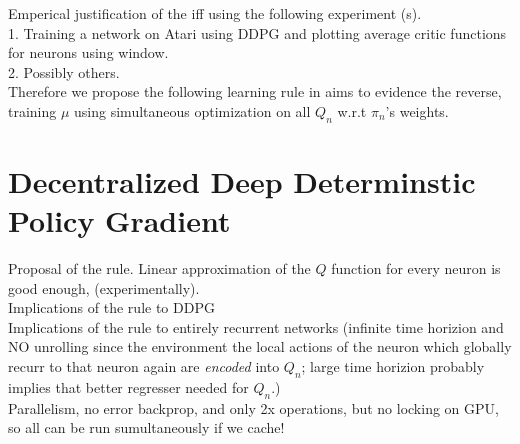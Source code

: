 \documentclass{article} %
\numberwithin{equation}{subsection}
\numberwithin{theorem}{subsection}
\begin{document}
Emperical justification of the iff using the following experiment (s).\\
1. Training a network on Atari using DDPG and plotting average critic functions for neurons using window. \\[2cm]
2. Possibly others. \\[2cm]


Therefore we propose the following learning rule in aims to evidence the reverse, training $\mu$ using simultaneous optimization on all $Q_n$ w.r.t $\pi_n$'s weights.


\section{Decentralized Deep Determinstic Policy Gradient}
Proposal of the rule. Linear approximation of the $Q$ function for every neuron is good enough, (experimentally). \\[2cm] 

Implications of the rule to DDPG\\[2cm]

Implications of the rule to entirely recurrent networks (infinite time horizion and NO unrolling since the environment
the local actions of the neuron which globally recurr to that neuron again are \emph{encoded} into $Q_n$; large time horizion
probably implies that better regresser needed for $Q_n$.)\\[2cm]

Parallelism, no error backprop, and only 2x operations, but no locking on GPU, so all can be run sumultaneously if we cache!\\[2cm]
\end{document}
